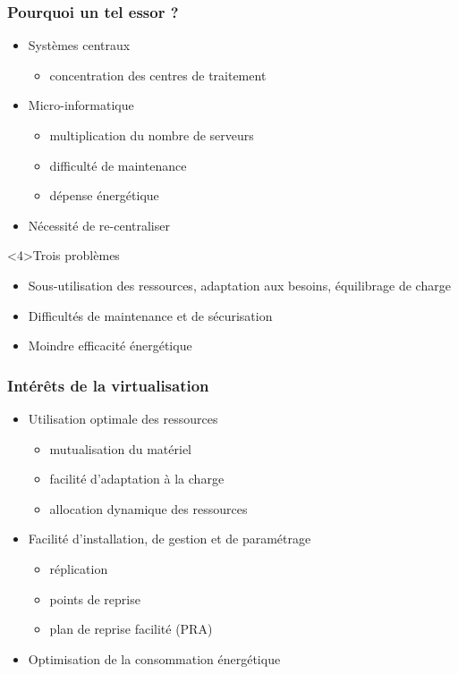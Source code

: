 \begin{frame}
\frametitle{Pourquoi un tel essor ?}
\begin{itemize}
\item <1->Systèmes centraux
\begin{itemize}
\item concentration des centres de traitement
\end{itemize}

\item <2->Micro-informatique
\begin{itemize}
\item multiplication du nombre de serveurs
\item difficulté de maintenance
\item dépense énergétique
\end{itemize}

\item <3->Nécessité de re-centraliser
\end{itemize}

\begin{block}<4>{Trois problèmes}
\begin{itemize}
\item Sous-utilisation des ressources, adaptation aux besoins, équilibrage de charge
\item Difficultés de maintenance et de sécurisation
\item Moindre efficacité énergétique
\end{itemize}
\end{block}
\end{frame}

\begin{frame}
\frametitle{Intérêts de la virtualisation}
\begin{itemize}
\item <1->Utilisation optimale des ressources
\begin{itemize}
\item mutualisation du matériel
\item facilité d'adaptation à la charge
\item allocation dynamique des ressources
\end{itemize}
\item <2->Facilité d'installation, de gestion et de paramétrage
\begin{itemize}
\item réplication
\item points de reprise
\item plan de reprise facilité (PRA)
\end{itemize}
\item <3->Optimisation de la consommation énergétique
\end{itemize}
\end{frame}

